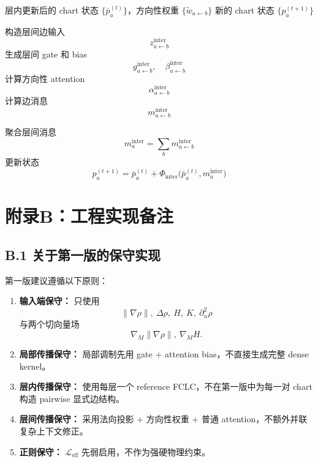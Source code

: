 \documentclass[12pt,a4paper]{ctexart}
\begin{document}
\begin{algorithm}[H]
\caption{Inter-layer Directional Propagation}
\begin{algorithmic}[1]
\Require 层内更新后的 chart 状态 \(\{\bar p_a^{(t)}\}\)，方向性权重 \(\{\tilde w_{a\leftarrow b}\}\)
\Ensure 新的 chart 状态 \(\{p_a^{(t+1)}\}\)

        \State 构造层间边输入
        \[
        z_{a\leftarrow b}^{\mathrm{inter}}
        \]
        \State 生成层间 gate 和 bias
        \[
        g_{a\leftarrow b}^{\mathrm{inter}},\quad
        \beta_{a\leftarrow b}^{\mathrm{inter}}
        \]
        \State 计算方向性 attention
        \[
        \alpha_{a\leftarrow b}^{\mathrm{inter}}
        \]
        \State 计算边消息
        \[
        m_{a\leftarrow b}^{\mathrm{inter}}
        \]
    \EndFor

        \State 聚合层间消息
        \[
        m_a^{\mathrm{inter}}
        =
        \sum_b m_{a\leftarrow b}^{\mathrm{inter}}
        \]
        \State 更新状态
        \[
        p_a^{(t+1)}
        =
        \bar p_a^{(t)}
        +
        \Phi_{\mathrm{inter}}
        \big(
        \bar p_a^{(t)},
        m_a^{\mathrm{inter}}
        \big)
        \]
    \EndFor
\EndFor
\end{algorithmic}
\end{algorithm}

\section{附录B：工程实现备注}

\subsection{B.1 关于第一版的保守实现}

第一版建议遵循以下原则：

\begin{enumerate}[leftmargin=2em]
    \item \textbf{输入端保守：}
    只使用
    \[
    \|\nabla\rho\|,\ \Delta\rho,\ H,\ K,\ \partial_n^2\rho
    \]
    与两个切向量场
    \[
    \nabla_M\|\nabla\rho\|,\ \nabla_M H.
    \]

    \item \textbf{局部传播保守：}
    局部调制先用 gate + attention bias，不直接生成完整 dense kernel。

    \item \textbf{层内传播保守：}
    使用每层一个 reference FCLC，不在第一版中为每一对 chart 构造 pairwise 显式边结构。

    \item \textbf{层间传播保守：}
    采用法向投影 + 方向性权重 + 普通 attention，不额外并联复杂上下文修正。

    \item \textbf{正则保守：}
    \(\mathcal L_{\mathrm{eff}}\) 先弱启用，不作为强硬物理约束。
\end{enumerate}
\end{document}
